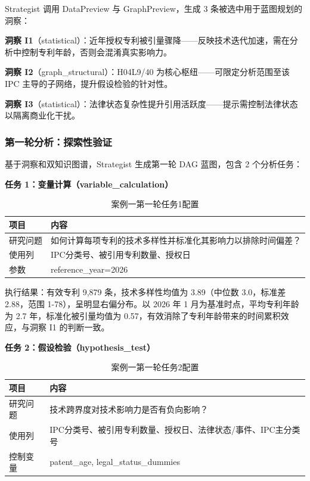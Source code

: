 Strategist 调用 DataPreview 与 GraphPreview，生成 3 条被选中用于蓝图规划的洞察：

\textbf{洞察 I1}（statistical）：近年授权专利被引量骤降——反映技术迭代加速，需在分析中控制专利年龄，否则会混淆真实影响力。

\textbf{洞察 I2}（graph\_structural）：H04L9/40 为核心枢纽——可限定分析范围至该 IPC 主导的子网络，提升假设检验的针对性。

\textbf{洞察 I3}（statistical）：法律状态复杂性提升引用活跃度——提示需控制法律状态以隔离商业化干扰。

\subsubsection{第一轮分析：探索性验证}

基于洞察和双知识图谱，Strategist 生成第一轮 DAG 蓝图，包含 2 个分析任务：

\textbf{任务 1：变量计算（variable\_calculation）}


\begin{table}[htbp]
\centering
\caption{案例一第一轮任务1配置}
\label{tab:case1-r1-t1}
\begin{tabular}{>{\centering\arraybackslash}p{3.2cm} >{\raggedright\arraybackslash}p{10.4cm}}
\toprule %
项目 & 内容 \\
\midrule %
研究问题 & 如何计算每项专利的技术多样性并标准化其影响力以排除时间偏差？ \\
使用列   & IPC分类号、被引用专利数量、授权日 \\
参数     & reference\_year=2026 \\
\bottomrule %
\end{tabular}
\end{table}

执行结果：有效专利 9,879 条，技术多样性均值为 3.89（中位数 3.0，标准差 2.88，范围 1-78），呈明显右偏分布。以 2026 年 1 月为基准时点，平均专利年龄为 2.7 年，标准化被引量均值为 0.57，有效消除了专利年龄带来的时间累积效应，与洞察 I1 的判断一致。

\textbf{任务 2：假设检验（hypothesis\_test）}


\begin{table}[htbp]
\centering
\caption{案例一第一轮任务2配置}
\label{tab:case1-r1-t2}
\begin{tabular}{>{\centering\arraybackslash}p{3.2cm} >{\raggedright\arraybackslash}p{10.4cm}}
\toprule %
项目 & 内容 \\
\midrule %
研究问题 & 技术跨界度对技术影响力是否有负向影响？ \\ \addlinespace[0.5ex] %
使用列   & IPC分类号、被引用专利数量、授权日、法律状态/事件、IPC主分类号 \\ \addlinespace[0.5ex]
控制变量 & patent\_age, legal\_status\_dummies \\
\bottomrule %
\end{tabular}
\end{table}

